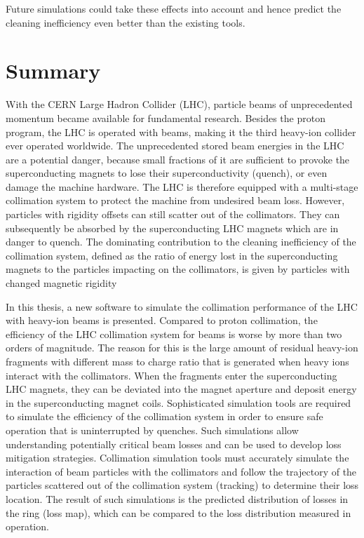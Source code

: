 Future simulations could take these effects into account and hence predict the cleaning inefficiency even better than the existing tools.



\chapter*{Summary} \label{chap:sum}


With the CERN Large Hadron Collider (LHC), particle beams of unprecedented momentum became available for fundamental research. Besides the proton program, the LHC is operated with \lead beams, making it the third heavy-ion collider ever operated worldwide. The unprecedented stored beam energies in the LHC are a potential danger, because small fractions of it are sufficient to provoke the superconducting magnets to lose their superconductivity (quench), or even damage the machine hardware. The LHC is therefore equipped with a multi-stage collimation system to protect the machine from undesired beam loss. However, particles with rigidity offsets can still scatter out of the collimators. They can subsequently be absorbed by the superconducting LHC magnets which are in danger to quench. The dominating contribution to the cleaning inefficiency of the collimation system, defined as the ratio of energy lost in the superconducting magnets to the particles impacting on the collimators, is given by particles with changed magnetic rigidity


\vspace{0.2cm}

In this thesis, a new software to simulate the collimation performance of the LHC with heavy-ion beams is presented. Compared to proton collimation, the efficiency of the LHC collimation system for \lead beams is worse by more than two orders of magnitude. The reason for this is the large amount of residual heavy-ion fragments with different mass to charge ratio that is generated when heavy ions interact with the collimators. When the fragments enter the superconducting LHC magnets, they can be deviated into the magnet aperture and deposit energy in the superconducting magnet coils. Sophisticated simulation tools are required to simulate the efficiency of the collimation system in order to ensure safe operation that is uninterrupted by quenches. Such simulations allow understanding potentially critical beam losses and can be used to develop loss mitigation strategies. Collimation simulation tools must accurately simulate the interaction of beam particles with the collimators and follow the trajectory of the particles scattered out of the collimation system (tracking) to determine their loss location. The result of such simulations is the predicted distribution of losses in the ring (loss map), which can be compared to the loss distribution measured in operation.
\vspace{0.2cm}

